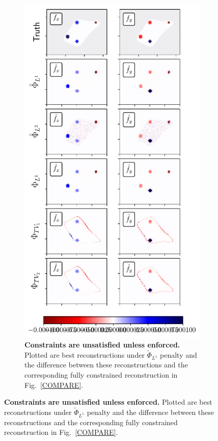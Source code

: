 \documentclass[aps,prl,reprint,twocolumn,groupedaddress,showpacs]{revtex4}
\begin{document}
\begin{figure}
\begin{figure}
\includegraphics[width=\linewidth]{fig3}
\caption{\textbf{Constraints are unsatisfied unless enforced.} Plotted are best reconstructions
  under $\tilde{\Phi}_{L^{1}}$ penalty and the difference between
  these reconstructions and the corresponding fully constrained
  reconstruction in Fig.~\ref{COMPARE}. }
\label{fig:fig3}
\end{figure}


\end{figure}
\end{document}
